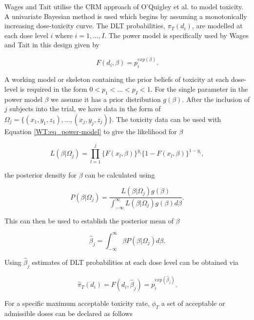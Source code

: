 Wages and Tait \cite{wagesSeamlessPhaseII2015} utilise the CRM approach of O'Quigley et al. \cite{oquigleyContinualReassessmentMethod1990} to model toxicity. A univariate Bayesian method is used which begins by assuming a monotonically increasing dose-toxicity curve. The DLT probabilities, $\pi_T(d_i)$, are modelled at each dose level $i$ where $i= 1, ..., I$. The power model is specifically used by Wages and Tait in this design given by 

\begin{equation}
	\label{WT:eq_power-model}
	F(d_i, \beta) = p_i^{exp(\beta)}.
\end{equation}

A working model or skeleton containing the prior beliefs of toxicity at each dose-level is required in the form $0 < p_1 < ... <p_I <1$. For the single parameter in the power model $\beta$ we assume it has a prior distribution $g(\beta)$. After the inclusion of $j$ subjects into the trial, we have  data in the form of $\Omega_j = \{(x_1,y_1,z_1), ..., (x_j,y_j,z_j)\}$. The toxicity data can be used with Equation \ref{WT:eq_power-model} to give the likelihood for $\beta$

\begin{equation}
	L(\beta|\Omega_j)=\prod_{l=1}^{j}\{F(x_l,\beta)\}^{y_l}\{1-F(x_l,\beta)\}^{1-y_l},  
\end{equation}

the posterior density for $\beta$ can be calculated using  

\begin{equation}
	P(\beta|\Omega_j) = \frac{L(\beta|\Omega_j)g(\beta)}{\int_{-\infty}^{\infty}L(\beta|\Omega_j)g(\beta)d\beta}. 
\end{equation}

This can then be used to establish the posterior mean of $\beta$

\begin{equation}
	\hat{\beta}_j = \int_{-\infty}^{\infty}\beta P(\beta|\Omega_j)d\beta.
\end{equation} 

Using $\hat{\beta}_j$ estimates of DLT probabilities at each dose level can be obtained via 

\begin{equation}
	\hat{\pi}_T(d_i) = F(d_i, \hat{\beta}_j) = p_i^{exp(\hat{\beta}_j)}. 
\end{equation}

For a specific maximum acceptable toxicity rate, $\phi_T$ a set of acceptable or admissible doses can be declared as follows

